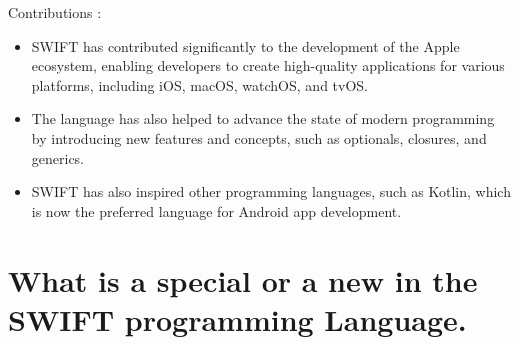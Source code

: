 \documentclass[11pt]{Abdullahmad} %
\begin{document}
Contributions :
\begin{itemize}
	\item SWIFT has contributed significantly to the development of the Apple ecosystem, enabling
       developers to create high-quality applications for various platforms, including iOS, macOS, 
       watchOS, and tvOS.
	\item The language has also helped to advance the state of modern programming by introducing 
       new features and concepts, such as optionals, closures, and generics.
	\item SWIFT has also inspired other programming languages, such as Kotlin, which is now the 
       preferred language for Android app development.
\end{itemize}



\section*{What is a special or a new in the SWIFT programming Language.}
\end{document}
